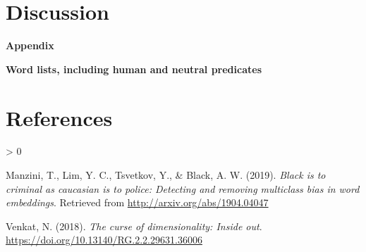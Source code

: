 \documentclass[
  10pt,
  dvipsnames,enabledeprecatedfontcommands]{scrartcl}
\newlength{\cslhangindent}
\newenvironment{CSLReferences}[2] %
 {%
  \setlength{\parindent}{0pt}
  \ifodd #1 \everypar{\setlength{\hangindent}{\cslhangindent}}\ignorespaces\fi
  \ifnum #2 > 0
  \setlength{\parskip}{#2\baselineskip}
  \fi
 }%
 {}
\begin{document}
\hypertarget{discussion}{%
\section{Discussion}\label{discussion}}

\newpage

\noindent \huge  \textbf{Appendix} \normalsize

\noindent \Large \textbf{Word lists, including human and neutral predicates}
\normalsize

\hypertarget{references}{%
\section*{References}\label{references}}

\vspace{-3mm}

\hypertarget{refs}{}
\begin{CSLReferences}{1}{0}
\leavevmode\hypertarget{ref-Manzini2019blackToCriminal}{}%
Manzini, T., Lim, Y. C., Tsvetkov, Y., \& Black, A. W. (2019).
\emph{Black is to criminal as caucasian is to police: Detecting and
removing multiclass bias in word embeddings}. Retrieved from
\url{http://arxiv.org/abs/1904.04047}

\leavevmode\hypertarget{ref-Venkat2018Curse}{}%
Venkat, N. (2018). \emph{The curse of dimensionality: Inside out}.
\url{https://doi.org/10.13140/RG.2.2.29631.36006}

\end{CSLReferences}
\end{document}
